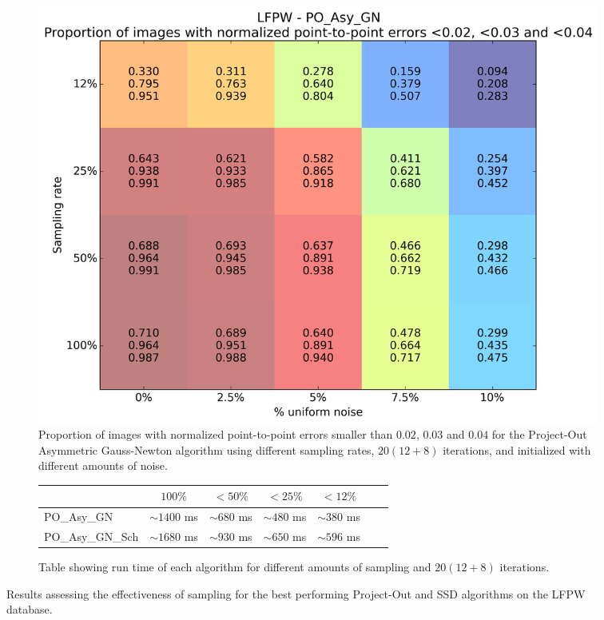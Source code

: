 \begin{figure}[h!]
\begin{subfigure}{0.48\textwidth}
	    \label{fig:sampling_vs_noise_ssd_asy_gn_20}
	\end{subfigure}
	\hfill
	\begin{subfigure}{0.48\textwidth}
	    \includegraphics[width=\textwidth]{experiments/sampling/sampling_vs_noise_po_asy_gn.png}
	    \caption{Proportion of images with normalized point-to-point errors smaller than $0.02$, $0.03$ and $0.04$ for the Project-Out Asymmetric Gauss-Newton algorithm using different sampling rates, $20 (12 + 8)$ iterations, and initialized with different amounts of noise.}
	    \label{fig:sampling_vs_noise_po_asy_gn_20}
	\end{subfigure}
	\par\bigskip\bigskip
	\begin{subfigure}{\textwidth}
		\center
		\begin{tabular}{lcccccc}
		    \toprule
		    & $100\%$ & $<50\%$ & $<25\%$ & $<12\%$ 
		    \\
		    \midrule
		    PO\_Asy\_GN & $\sim1400$ ms & $\sim680$ ms & $\sim480$ ms & $\sim380$ ms
		    \\ 
		    PO\_Asy\_GN\_Sch & $\sim1680$ ms & $\sim930$ ms & $\sim650$ ms & $\sim596$ ms
		    \\
		    \bottomrule
	  	\end{tabular}
	  	\caption{Table showing run time of each algorithm for different amounts of sampling and $20 (12 + 8)$ iterations.}
	    \label{tab:runtime_20}
	\end{subfigure}
	\caption{Results assessing the effectiveness of sampling for the best performing Project-Out and SSD algorithms on the LFPW database.}
	\label{fig:sampling}
\end{figure}


